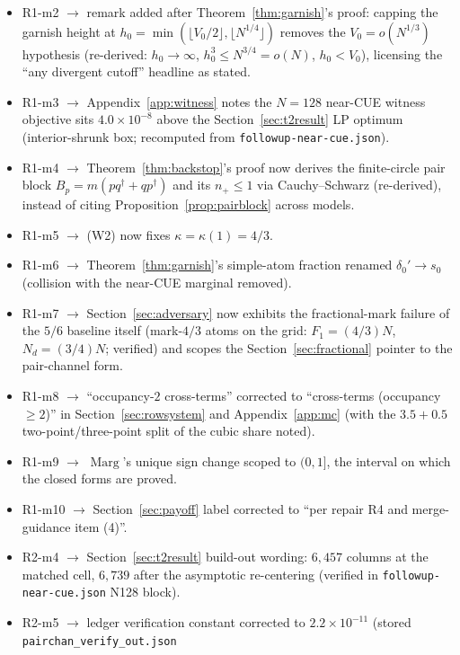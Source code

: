 \documentclass[11pt]{article}
\theoremstyle{plain}
\theoremstyle{definition}
\theoremstyle{remark}
\newcommand{\Nd}{N_{d}}
\newcommand{\Marg}{\operatorname{Marg}}
\begin{document}
\begin{itemize}
\item R1-m2 $\to$ remark added after Theorem~\ref{thm:garnish}'s proof: capping
  the garnish height at
  $h_0 = \min(\lfloor V_0/2 \rfloor, \lfloor N^{1/4} \rfloor)$ removes the
  $V_0 = o(N^{1/3})$ hypothesis (re-derived: $h_0 \to \infty$,
  $h_0^3 \le N^{3/4} = o(N)$, $h_0 < V_0$), licensing the ``any divergent
  cutoff'' headline as stated.
\item R1-m3 $\to$ Appendix~\ref{app:witness} notes the $N = 128$ near-CUE witness
  objective sits $4.0 \times 10^{-8}$ above the Section~\ref{sec:t2result} LP
  optimum (interior-shrunk box; recomputed from
  \texttt{followup-near-cue.json}).
\item R1-m4 $\to$ Theorem~\ref{thm:backstop}'s proof now derives the
  finite-circle pair block $B_p = m(p q^{\dagger} + q p^{\dagger})$ and its
  $n_+ \le 1$ via Cauchy--Schwarz (re-derived), instead of citing
  Proposition~\ref{prop:pairblock} across models.
\item R1-m5 $\to$ (W2) now fixes $\kappa = \kappa(1) = 4/3$.
\item R1-m6 $\to$ Theorem~\ref{thm:garnish}'s simple-atom fraction renamed
  $\delta_0' \to s_0$ (collision with the near-CUE marginal removed).
\item R1-m7 $\to$ Section~\ref{sec:adversary} now exhibits the fractional-mark
  failure of the $5/6$ baseline itself (mark-$4/3$ atoms on the grid:
  $F_1 = (4/3)N$, $\Nd = (3/4)N$; verified) and scopes the
  Section~\ref{sec:fractional} pointer to the pair-channel form.
\item R1-m8 $\to$ ``occupancy-$2$ cross-terms'' corrected to ``cross-terms
  (occupancy $\ge 2$)'' in Section~\ref{sec:rowsystem} and Appendix~\ref{app:mc}
  (with the $3.5 + 0.5$ two-point/three-point split of the cubic share noted).
\item R1-m9 $\to$ $\Marg$'s unique sign change scoped to $(0, 1]$, the interval
  on which the closed forms are proved.
\item R1-m10 $\to$ Section~\ref{sec:payoff} label corrected to ``per repair R4
  and merge-guidance item (4)''.
\item R2-m4 $\to$ Section~\ref{sec:t2result} build-out wording: $6{,}457$
  columns at the matched cell, $6{,}739$ after the asymptotic re-centering
  (verified in \texttt{followup-near-cue.json} N128 block).
\item R2-m5 $\to$ ledger verification constant corrected to
  $2.2 \times 10^{-11}$ (stored \texttt{pairchan\_}\allowbreak\texttt{verify\_out.json}

\end{itemize}
\end{document}
